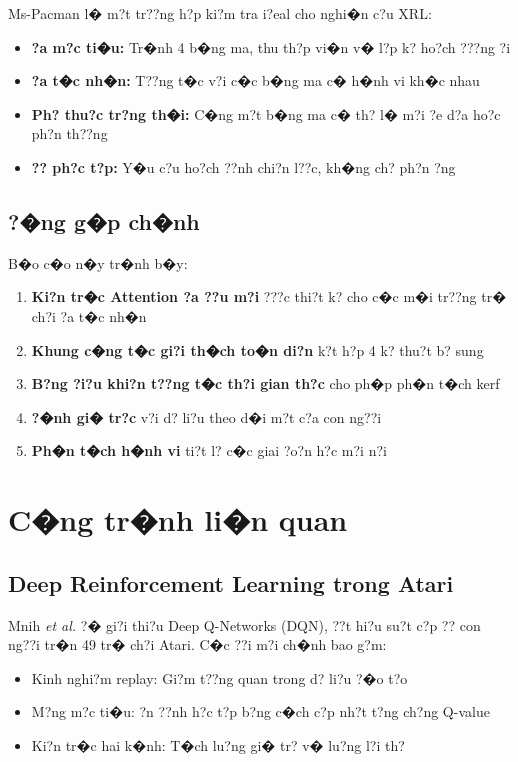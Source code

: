 \documentclass[11pt,a4paper]{article}
\begin{document}
Ms-Pacman l� m?t tr??ng h?p ki?m tra i?eal cho nghi�n c?u XRL:
\begin{itemize}
    \item \textbf{?a m?c ti�u:} Tr�nh 4 b�ng ma, thu th?p vi�n v� l?p k? ho?ch ???ng ?i
    \item \textbf{?a t�c nh�n:} T??ng t�c v?i c�c b�ng ma c� h�nh vi kh�c nhau
    \item \textbf{Ph? thu?c tr?ng th�i:} C�ng m?t b�ng ma c� th? l� m?i ?e d?a ho?c ph?n th??ng
    \item \textbf{?? ph?c t?p:} Y�u c?u ho?ch ??nh chi?n l??c, kh�ng ch? ph?n ?ng
\end{itemize}

\subsection{?�ng g�p ch�nh}

B�o c�o n�y tr�nh b�y:
\begin{enumerate}
    \item \textbf{Ki?n tr�c Attention ?a ??u m?i} ???c thi?t k? cho c�c m�i tr??ng tr� ch?i ?a t�c nh�n
    \item \textbf{Khung c�ng t�c gi?i th�ch to�n di?n} k?t h?p 4 k? thu?t b? sung
    \item \textbf{B?ng ?i?u khi?n t??ng t�c th?i gian th?c} cho ph�p ph�n t�ch kerf
    \item \textbf{?�nh gi� tr?c}  v?i d? li?u theo d�i m?t c?a con ng??i
    \item \textbf{Ph�n t�ch h�nh vi} ti?t l? c�c giai ?o?n h?c m?i n?i
\end{enumerate}


\section{C�ng tr�nh li�n quan}

\subsection{Deep Reinforcement Learning trong Atari}

Mnih \textit{et al.} \cite{mnih2013, mnih2015} ?� gi?i thi?u Deep Q-Networks (DQN), ??t hi?u su?t c?p ?? con ng??i tr�n 49 tr� ch?i Atari. C�c ??i m?i ch�nh bao g?m:
\begin{itemize}
    \item Kinh nghi?m replay: Gi?m t??ng quan trong d? li?u ?�o t?o
    \item M?ng m?c ti�u: ?n ??nh h?c t?p b?ng c�ch c?p nh?t t?ng ch?ng Q-value
    \item Ki?n tr�c hai k�nh: T�ch lu?ng gi� tr? v� lu?ng l?i th?
\end{itemize}
\end{document}
